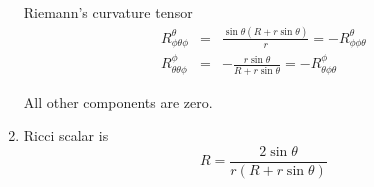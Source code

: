 \documentclass[12pt,a4paper]{article}
\begin{document}
\begin{enumerate}
Riemann's curvature tensor
\begin{eqnarray*}
	R^\theta_{\phi\theta\phi} &=& \frac{\sin\theta(R+r\sin\theta)}{r} = -	R^{\theta}_{\phi\phi\theta} \\
	R^\phi_{\theta\theta\phi} &=& -\frac{r\sin\theta}{R+r\sin\theta} = -R^\phi_{\theta\phi\theta}
\end{eqnarray*}

All other components are zero.




\item

Ricci scalar is
\begin{equation*}
	R=\frac{2\sin\theta}{r(R+r\sin\theta)} 
\end{equation*}











\end{enumerate}
\end{document}

